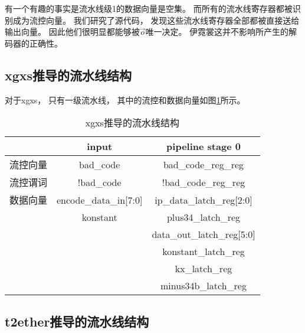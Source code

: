 有一个有趣的事实是流水线级1的数据向量是空集。
而所有的流水线寄存器都被识别成为流控向量。
我们研究了源代码，
发现这些流水线寄存器全部都被直接送给输出向量。
因此他们很明显都能够被$\vec{o}$唯一决定。
伊霓裳这并不影响所产生的解码器的正确性。



\subsection{xgxs推导的流水线结构}


对于xgxs，
只有一级流水线，
其中的流控和数据向量如图\ref{tab_xgxs}所示。

\begin{table}[b]
\centering
\caption{xgxs推导的流水线结构}
\begin{tabular}{|c|c|c|}
\hline
                       & input                  &  pipeline stage 0    \\\hline\hline
流控向量               &bad\_code               & bad\_code\_reg\_reg\\\hline
流控谓词               &!bad\_code              & !bad\_code\_reg\_reg \\\hline
数据向量               &encode\_data\_in[7:0]   &ip\_data\_latch\_reg[2:0] \\
                       &konstant                &plus34\_latch\_reg     \\
                       &                        &data\_out\_latch\_reg[5:0]\\
                       &                        &konstant\_latch\_reg   \\
                       &                        &kx\_latch\_reg         \\
                       &                        &minus34b\_latch\_reg   \\\hline
\end{tabular}\label{tab_xgxs}
\end{table}


\subsection{t2ether推导的流水线结构}


